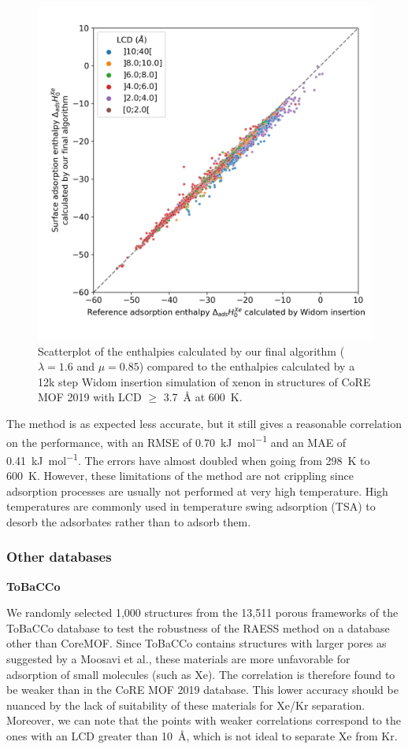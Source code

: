 \documentclass[main]{subfiles}
\begin{document}
\begin{figure}[ht]
\centering
  \includegraphics[width=0.5\linewidth]{figures/3-fastsim/H_Xe_widom_vs_H_Xe_surface_final_zoom_600K.jpeg}
  \caption{Scatterplot of the enthalpies calculated by our final algorithm ($\lambda=1.6$ and $\mu=0.85$) compared to the enthalpies calculated by a 12k step Widom insertion simulation of xenon in structures of CoRE MOF 2019 with LCD $\geq$ \SI{3.7}{\angstrom} at \SI{600}{\kelvin}. }
\end{figure}

The method is as expected less accurate, but it still gives a reasonable correlation on the performance, with an RMSE of \SI{0.70}{\kilo\joule\per\mole} and an MAE of \SI{0.41}{\kilo\joule\per\mole}. The errors have almost doubled when going from \SI{298}{\kelvin} to \SI{600}{\kelvin}. However, these limitations of the method are not crippling since adsorption processes are usually not performed at very high temperature. High temperatures are commonly used in temperature swing adsorption (TSA) to desorb the adsorbates rather than to adsorb them.

\subsubsection{Other databases}\label{sct:other_database}

\textbf{ToBaCCo}

We randomly selected 1,000 structures from the 13,511 porous frameworks of the ToBaCCo database to test the robustness of the RAESS method on a database other than CoreMOF. Since ToBaCCo contains structures with larger pores as suggested by a Moosavi et al., these materials are more unfavorable for adsorption of small molecules (such as Xe). The correlation is therefore found to be weaker than in the CoRE MOF 2019 database. This lower accuracy should be nuanced by the lack of suitability of these materials for Xe/Kr separation. Moreover, we can note that the points with weaker correlations correspond to the ones with an LCD greater than \SI{10}{\angstrom}, which is not ideal to separate Xe from Kr.
\end{document}
